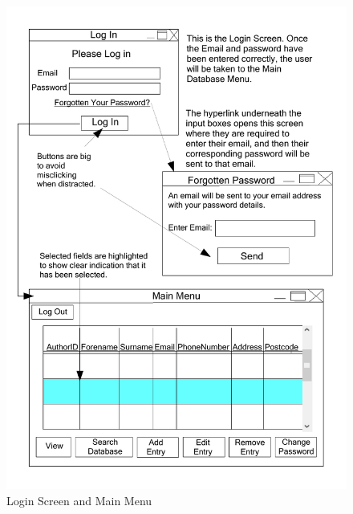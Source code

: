 \begin{figure}[H]
    \caption{Login Screen and Main Menu} \label{Login_Screen_and_Main_Menu.pdf}
    \includegraphics[width=\textwidth]{./Design/UserInterfaceDesign/Login_Screen_and_Main_Menu.pdf}
\end{figure}

